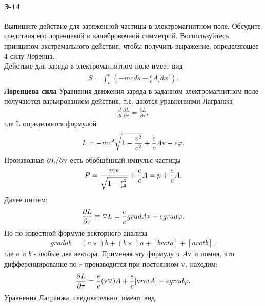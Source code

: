 


\paragraph{Э-14}
Выпишите действие для заряженной частицы в электромагнитном поле. Обсудите следствия его лоренцевой и калибровочной симметрий. Воспользуйтесь принципом экстремального действия, чтобы получить выражение, определяющее 4-силу Лоренца.\\

Действие для заряда в электромагнитном поле имеет вид
\begin{gather*}
	S = \int_{a}^{b}(-mcds - \frac{e}{c}A_idx^i).
\end{gather*}
\textbf{Лоренцева сила}
Уравнения движения заряда в заданном электромагнитном поле получаются варьированием действия, т.е. даются уравнениями Лагранжа
\begin{gather}
	\label{e-14-ur}
	\frac{d}{dt}\frac{\partial L}{\partial v} = \frac{\partial L}{\partial \tau},
\end{gather}
где L определяется формулой
\begin{gather*}
	L = -mc^2\sqrt{1 - \frac{v^2}{c^2}} + \frac{e}{c}A\textnormal{v} - e\varphi.
\end{gather*}
Производная $\partial L/\partial\textnormal{v}$ есть обобщённый импульс частицы
\begin{gather*}
	P = \frac{m\textnormal{v}}{\sqrt{1-\frac{v^2}{c^2}}} + \frac{e}{c}A = p + \frac{e}{c}A.
\end{gather*}
Далее пишем:\\
\begin{gather*}
 \frac{\partial L}{\partial \tau} \equiv \triangledown L = \frac{e}{c}grad A\textnormal{v} - e grad \varphi.
\end{gather*}
Но по известной формуле векторного анализа
\begin{gather*}
	grad ab = (a\triangledown)b + (b\triangledown)a + [brot a] + [arot b],
\end{gather*}
где $a$ и $b$ - любые два вектора. Применяя эту формулу к $A\textnormal{v}$ и помня, что дифференцирование по $r$ производится при постоянном $\textnormal{v}$, находим:
\begin{gather*}
	\frac{\partial L}{\partial\tau} = \frac{e}{c}(\textnormal{v}\triangledown)A + \frac{e}{c}[\textnormal{v}rotA] - egrad\varphi.
\end{gather*}
Уравнения Лагранжа, следовательно, имеют вид
